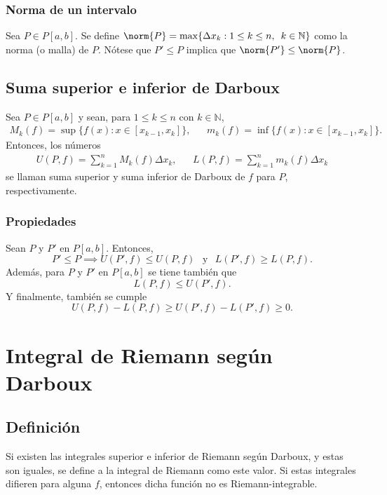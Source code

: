 \documentclass{article}
\renewcommand{\headrulewidth}{2pt}
\begin{document}
\subsubsection*{Norma de un intervalo}
Sea $P\in P[a,b]$. Se define $\norm{P}=\max\{\Delta x_k: 1\leq k\leq n,\hspace{5pt} k\in\mathbb{N}\}$ como la norma (o malla) de $P$. Nótese que $P'\leq P$ implica que $\norm{P'}\leq\norm{P}$.

\newpage
\pagestyle{fancy}
\fancyhf{}
\renewcommand{\headrulewidth}{2pt}
\fancyfoot{}
\rfoot{\thepage}
\lfoot{}
\setlength{\headheight}{28pt}

\subsection*{Suma superior e inferior de Darboux}
Sea $P\in P[a,b]$ y sean, para $1\leq k\leq n$ con $k\in\mathbb{N}$,
\begin{align*}
M_k(f)=\sup\{f(x): x\in[x_{k-1},x_k]\}, && m_k(f)=\inf\{f(x): x\in[x_{k-1},x_k]\}.
\end{align*}
Entonces, los números
\begin{align*}
U(P,f)=\sum_{k=1}^{n}M_k(f)\Delta x_{k}, && L(P,f)=\sum_{k=1}^{n}m_k(f)\Delta x_{k}
\end{align*}
se llaman suma superior y suma inferior de Darboux de $f$ para $P$, respectivamente.

\subsubsection*{Propiedades}
Sean $P$ y $P'$ en $P[a,b]$. Entonces,
$$P'\leq P\implies U(P',f)\leq U(P,f) \hspace{5pt} \text{ y }\hspace{5pt} L(P',f)\geq L(P,f).$$
Además, para $P$ y $P'$ en $P[a,b]$ se tiene también que
$$L(P,f)\leq U(P',f).$$
Y finalmente, también se cumple
$$U(P,f)-L(P,f)\geq U(P',f)-L(P',f)\geq 0.$$

\section*{Integral de Riemann según Darboux}

\subsection*{Definición}
Si existen las integrales superior e inferior de Riemann según Darboux, y estas son iguales, se define a la integral de Riemann como este valor. Si estas integrales difieren para alguna $f$, entonces dicha función no es Riemann-integrable.
\end{document}
